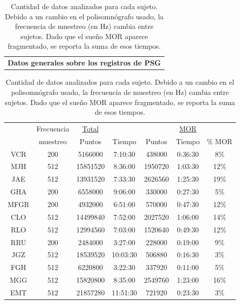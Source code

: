 \documentclass[12pt,a4paper]{mitthesis}
\begin{document}
\begin{table}
\centering
\begin{tabular}{c}
\textbf{Datos generales sobre los registros de PSG}
\vspace{1em}
\end{tabular}
\begin{tabular}{c||c|cc|ccc}
    &Frecuencia& \underline{Total}& &   &\underline{MOR} &         \\
    &muestreo  &Puntos  &  Tiempo   &Puntos  &  Tiempo   &  \% MOR \\
\hline
\hline
VCR &200       & 5166000&   7:10:30 &438000  &   0:36:30 & 8\% \\
MJH &512       &15851520&   8:36:00 &1950720 &   1:03:30 &12\% \\
JAE &512       &13931520&   7:33:30 &2626560 &   1:25:30 &19\% \\
GHA &200       &6558000 &   9:06:00 &330000  &   0:27:30 & 5\% \\
MFGR&200       &4932000 &   6:51:00 &570000  &   0:47:30 &12\% \\
\hline
CLO &512       &14499840&   7:52:00 &2027520 &   1:06:00 &14\% \\
RLO &512       &12994560&   7:03:00 &1520640 &   0:49:30 &12\% \\
RRU &200       &2484000 &   3:27:00 &228000  &   0:19:00 & 9\% \\
JGZ &512       &18539520&  10:03:30 &506880  &   0:16:30 & 3\% \\
\hline
FGH &512       &6220800 &   3:22:30 &337920  &   0:11:00 & 5\% \\
MGG &512       &15820800&   8:35:00 &2549760 &   1:23:00 &16\% \\
EMT &512       &21857280&  11:51:30 &721920  &   0:23:30 & 3\%
\end{tabular}
\caption{Cantidad de datos analizados para cada sujeto. Debido a un cambio en el polisomn\'ografo 
usado, la frecuencia de muestreo (en Hz) cambia entre sujetos.
Dado que el sue\~no MOR aparece fragmentado, se reporta la suma de esos tiempos.}
\label{frecuencias}
\end{table}
\end{document}
